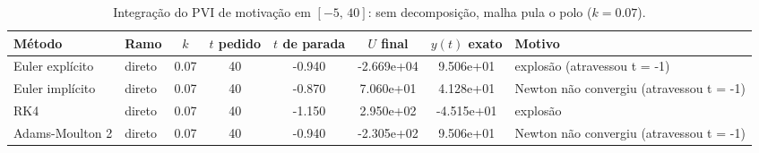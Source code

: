 \begin{table}[H]
    \centering
    \small
    \begin{tabular}{llcccccl}
        \hline
        Método & Ramo & $k$ & $t$ pedido & $t$ de parada & $U$ final & $y(t)$ exato & Motivo \\
        \hline
        Euler explícito & direto & 0.07 & 40 & -0.940 & -2.669e+04 & 9.506e+01 & explosão (atravessou t = -1) \\
        Euler implícito & direto & 0.07 & 40 & -0.870 & 7.060e+01 & 4.128e+01 & Newton não convergiu (atravessou t = -1) \\
        RK4 & direto & 0.07 & 40 & -1.150 & 2.950e+02 & -4.515e+01 & explosão \\
        Adams-Moulton 2 & direto & 0.07 & 40 & -0.940 & -2.305e+02 & 9.506e+01 & Newton não convergiu (atravessou t = -1) \\
        \hline
    \end{tabular}
    \caption{Integração do PVI de motivação em $[-5,\, 40]$: sem decomposição, malha pula o polo ($k = 0.07$).}
    \label{tab:m5_40_sd_pula_polo}
\end{table}

